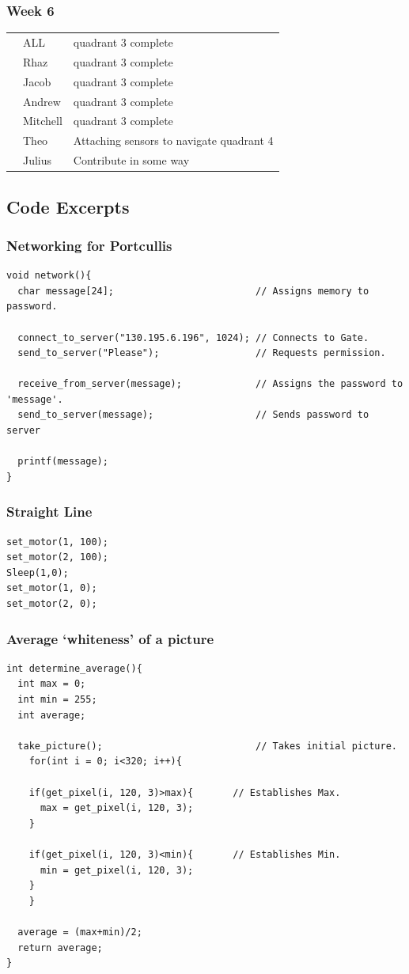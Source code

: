 \documentclass[paper=a4, fontsize=11pt]{scrartcl} %
\def\checkmark{\tikz\fill[scale=0.4] (0,.35) -- (.25,0) -- (1,.7) -- (.25,.15) -- cycle;}
\def\scalecheck{\resizebox{\widthof{\checkmark}*\ratio{\widthof{x}}{\widthof{\normalsize x}}}{!}{\checkmark}}
\numberwithin{equation}{section} %
\numberwithin{figure}{section} %
\begin{document}
\subsubsection*{Week 6}
\begin{tabularx}{\textwidth}{clX}
& ALL      & quadrant 3 complete\\
& Rhaz     & quadrant 3 complete\\
& Jacob    & quadrant 3 complete\\ 
& Andrew   & quadrant 3 complete\\ 
& Mitchell & quadrant 3 complete\\ 
\scalecheck & Theo     & Attaching sensors to navigate quadrant 4\\
& Julius   & Contribute in some way\\
\end{tabularx}

\subsection{Code Excerpts}

\subsubsection{Networking for Portcullis}
\begin{verbatim}
void network(){
  char message[24];							// Assigns memory to password.

  connect_to_server("130.195.6.196", 1024);	// Connects to Gate.
  send_to_server("Please");					// Requests permission.

  receive_from_server(message);				// Assigns the password to 'message'.
  send_to_server(message);					// Sends password to server

  printf(message);
}
\end{verbatim}

\subsubsection{Straight Line}
\begin{verbatim}
set_motor(1, 100);
set_motor(2, 100);
Sleep(1,0);
set_motor(1, 0);
set_motor(2, 0);
\end{verbatim}

\subsubsection{Average `whiteness' of a picture}
\begin{verbatim}
int determine_average(){
  int max = 0;
  int min = 255;
  int average;

  take_picture();							// Takes initial picture.
    for(int i = 0; i<320; i++){

    if(get_pixel(i, 120, 3)>max){		// Establishes Max.
      max = get_pixel(i, 120, 3);
    }

    if(get_pixel(i, 120, 3)<min){		// Establishes Min.
      min = get_pixel(i, 120, 3);
    }
    }

  average = (max+min)/2;
  return average;
}
\end{verbatim}
\end{document}

